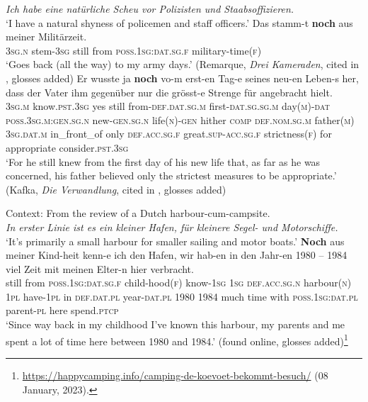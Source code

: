 \begin{exe}	\ex\label{exAppendixGermanSecondaryTemporalUses4}
	\textit{Ich habe eine natürliche Scheu vor Polizisten und Staabsoffizieren.}\\
	 \lq I have a natural shyness of policemen and staff officers.\rq
	 \exi{} \gll Das stamm-t \textbf{noch} aus meiner Militärzeit.\\
	 3\textsc{sg}.\textsc{n} stem-3\textsc{sg} still from \textsc{poss}.1\textsc{sg}:\textsc{dat}.\textsc{sg}.\textsc{f} military-time(\textsc{f})\\
	\glt \lq Goes back (all the way) to my army days.' (Remarque, \textit{Drei Kameraden}, cited in \cite[466]{Shetter1966}, glosses added)	
	\ex\label{exAppendixGermanSecondaryTemporalUses5}
	\gll Er wusste ja \textbf{noch} vo-m erst-en Tag-e seines neu-en Leben-s her, dass der Vater ihm gegenüber nur die grösst-e Strenge für angebracht hielt.\\
	3\textsc{sg}.\textsc{m} know.\textsc{pst}.3\textsc{sg} yes still from-\textsc{def}.\textsc{dat}.\textsc{sg}.\textsc{m} first-\textsc{dat}.\textsc{sg}.\textsc{sg}.\textsc{m} day(\textsc{m})-\textsc{dat} \textsc{poss}.3\textsc{sg}.\textsc{m}:\textsc{gen}.\textsc{sg}.\textsc{n} new-\textsc{gen}.\textsc{sg}.\textsc{n} life(\textsc{n})-\textsc{gen} hither \textsc{comp} \textsc{def}.\textsc{nom}.\textsc{sg}.\textsc{m} father(\textsc{m}) 3\textsc{sg}.\textsc{dat}.\textsc{m} in\_front\_of only \textsc{def}.\textsc{acc}.\textsc{sg}.\textsc{f} great.\textsc{sup}-\textsc{acc}.\textsc{sg}.\textsc{f} strictness(\textsc{f}) for appropriate consider.\textsc{pst}.3\textsc{sg}\\
	\glt \lq For he still knew from the first day of his new life that, as far as he was concerned, his father believed only the strictest measures to be appropriate.\rq{ }(Kafka, \textit{Die Verwandlung}, cited in \cite[47]{Shetter1966}, glosses added)	

	\ex\label{exAppendixGermanSecondaryTemporalUses6}
Context: From the review of a Dutch harbour-cum-campsite.\\
	\textit{In erster Linie ist es ein kleiner Hafen, für kleinere Segel- und Motorschiffe.}\\
	\lq It's primarily a small harbour for smaller sailing and motor boats.\rq
	\exi{}\gll \textbf{Noch} aus meiner Kind-heit kenn-e ich den Hafen, wir hab-en in den Jahr-en 1980 – 1984 viel Zeit mit meinen Elter-n hier verbracht.\\
	still from \textsc{poss}.1\textsc{sg}:\textsc{dat}.\textsc{sg}.\textsc{f} child-hood(\textsc{f}) know-1\textsc{sg} 1\textsc{sg} \textsc{def}.\textsc{acc}.\textsc{sg}.\textsc{n} harbour(\textsc{n}) 1\textsc{pl} have-1\textsc{pl} in \textsc{def}.\textsc{dat}.\textsc{pl} year-\textsc{dat}.\textsc{pl} 1980 {} 1984 much time with \textsc{poss}.1\textsc{sg}:\textsc{dat}.\textsc{pl} parent-\textsc{pl} here spend.\textsc{ptcp}\\
	\glt \lq Since way back in my childhood I've known this harbour, my parents and me spent a lot of time here between 1980 and 1984.\rq{ }(found online, glosses added)\footnote{\url{https://happycamping.info/camping-de-koevoet-bekommt-besuch/} (08 January, 2023).}
\end{exe}


